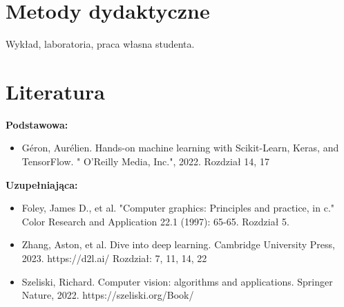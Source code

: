 \documentclass[12pt, a4paper]{article}
\begin{document}
\section{Metody dydaktyczne}

Wykład, laboratoria, praca własna studenta.

\section{Literatura}

\textbf{Podstawowa:}
\begin{itemize}
  \item Géron, Aurélien. Hands-on machine learning with Scikit-Learn, Keras, and TensorFlow. " O'Reilly Media, Inc.", 2022.  Rozdział 14, 17
\end{itemize}

\textbf{Uzupełniająca:}
\begin{itemize}
  \item Foley, James D., et al. "Computer graphics: Principles and practice, in c." Color Research and Application 22.1 (1997): 65-65. Rozdział 5.
  \item Zhang, Aston, et al. Dive into deep learning. Cambridge University Press, 2023. https://d2l.ai/ Rozdział: 7, 11, 14, 22
  \item Szeliski, Richard. Computer vision: algorithms and applications. Springer Nature, 2022. https://szeliski.org/Book/
\end{itemize}
\end{document}
